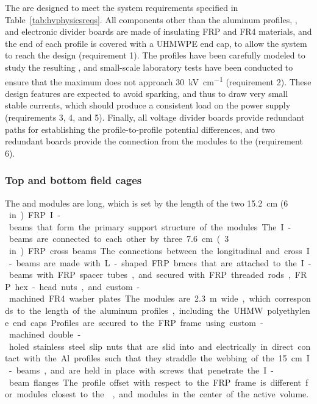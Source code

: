 The  %
are designed to %
meet the system requirements specified in Table~\ref{tab:hvphysicsreqs}. All components other than the aluminum profiles, , and electronic divider boards are made of insulating FRP and FR4 materials, and the end of each profile is covered with a UHMWPE end cap, to allow the system to reach the design  \efield{} (requirement 1). The profiles have been carefully modeled to study the resulting \efield{}, and small-scale laboratory tests have been conducted to ensure that the maximum \efield{} does not approach \SI{30}{\kV\per\cm} (requirement 2). These design features are expected to avoid sparking, and thus to draw very small stable currents, which should produce a consistent load on the power supply (requirements 3, 4, and 5). Finally, all voltage divider boards provide redundant paths for establishing the profile-to-profile potential differences, and two redundant boards provide the connection from the  modules to the  (requirement 6).

\subsubsection{Top and bottom field cages}

The  and  modules are \spfcmodlen{} long, which is set by the length of the two \SI{15.2}{\cm} (\SI{6}\,in) FRP I-beams that form the primary support structure of the modules. The I-beams are connected to each other by three  \SI{7.6}{\cm} (\SI{3}\,in) FRP cross beams. The connections between the longitudinal and cross I-beams are made with L-shaped FRP braces that are attached to the I-beams with FRP spacer tubes, and secured with FRP threaded rods, FRP hex-head nuts, and custom-machined FR4 washer plates.

The modules are \SI{2.3}{\m} wide, which corresponds to the length of the aluminum profiles, including the UHMW polyethylene end caps. Profiles are secured to the FRP frame using custom-machined double-holed stainless steel slip nuts that are slid into and electrically in direct contact with the Al profiles such that they straddle the webbing of the \SI{15}{\cm} I-beams, and are held in place with screws that penetrate the I-beam flanges. The profile offset with respect to the FRP frame is different for modules closest to the , %
and modules in the center of the active volume.

